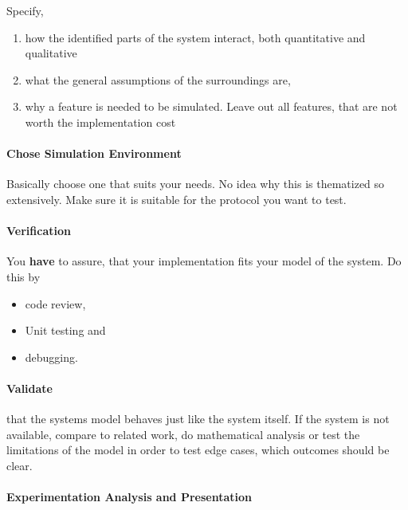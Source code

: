 \documentclass[english]{panikzettel}
\begin{document}
	Specify, 
	\begin{enumerate}
		\item how the identified parts of the system interact, both quantitative and qualitative
		\item what the general assumptions of the surroundings are,
		\item why a feature is needed to be simulated. Leave out all features, that are not worth the implementation cost
	\end{enumerate}

	\paragraph{Chose Simulation Environment}
	\label{pgf:performance-evaluation-study:chose-simulation-environment}
	
	Basically choose one that suits your needs. No idea why this is thematized so extensively.	
	Make sure it is suitable for the protocol you want to test.
	
	\paragraph{Verification}
	\label{pgf:performance-evaluation-study-:verification}
	
	You \textbf{have} to assure, that your implementation fits your model of the system. 
	Do this by 
	\begin{itemize}
		\item code review,
		\item Unit testing and
		\item debugging.
	\end{itemize}

	\paragraph{Validate}
	\label{pgf:performance-evaluation-study-:validate}
	
	that the systems model behaves just like the system itself.
	If the system is not available, compare to related work, do mathematical analysis or test the limitations of the model in order to test edge cases, which outcomes should be clear.

	\paragraph{Experimentation Analysis and Presentation}
	\label{pgf:performance-evaluation-study-:experimentation-analysis-and-presentation}
	
\end{document}
